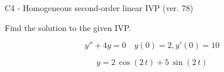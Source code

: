 \begin{exercise}
  \begin{exerciseTitle}C4 - Homogeneous second-order linear IVP (ver. 78)\end{exerciseTitle}
  \begin{exerciseStatement}
    
Find the solution to the given IVP.

    
\[y''+4y = 0 \hspace{1em} y(0) = 2 , y'(0) = 10\]

  \end{exerciseStatement}
  \begin{exerciseAnswer}
    
\[y= 2 \, \cos\left(2 \, t\right) + 5 \, \sin\left(2 \, t\right)\]

  \end{exerciseAnswer}
\end{exercise}